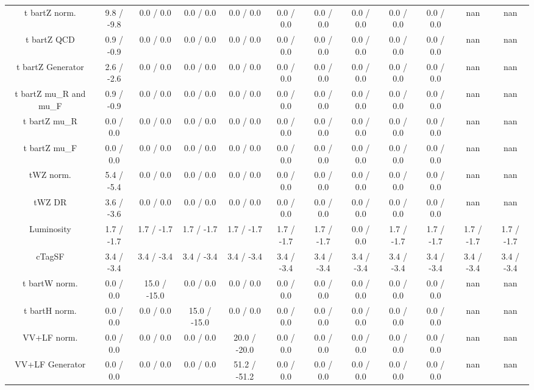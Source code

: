 \begin{table}[htbp]
\begin{center}
\begin{tabular}{|c|c|c|c|c|c|c|c|c|c|c|c|}
  t bar{t}Z norm. & 9.8 / -9.8 & 0.0 / 0.0 & 0.0 / 0.0 & 0.0 / 0.0 & 0.0 / 0.0 & 0.0 / 0.0 & 0.0 / 0.0 & 0.0 / 0.0 & 0.0 / 0.0 &    nan    &    nan    \\ 
  t bar{t}Z QCD & 0.9 / -0.9 & 0.0 / 0.0 & 0.0 / 0.0 & 0.0 / 0.0 & 0.0 / 0.0 & 0.0 / 0.0 & 0.0 / 0.0 & 0.0 / 0.0 & 0.0 / 0.0 &    nan    &    nan    \\ 
  t bar{t}Z Generator & 2.6 / -2.6 & 0.0 / 0.0 & 0.0 / 0.0 & 0.0 / 0.0 & 0.0 / 0.0 & 0.0 / 0.0 & 0.0 / 0.0 & 0.0 / 0.0 & 0.0 / 0.0 &    nan    &    nan    \\ 
  t bar{t}Z  mu_{R} and  mu_{F} & 0.9 / -0.9 & 0.0 / 0.0 & 0.0 / 0.0 & 0.0 / 0.0 & 0.0 / 0.0 & 0.0 / 0.0 & 0.0 / 0.0 & 0.0 / 0.0 & 0.0 / 0.0 &    nan    &    nan    \\ 
  t bar{t}Z  mu_{R} & 0.0 / 0.0 & 0.0 / 0.0 & 0.0 / 0.0 & 0.0 / 0.0 & 0.0 / 0.0 & 0.0 / 0.0 & 0.0 / 0.0 & 0.0 / 0.0 & 0.0 / 0.0 &    nan    &    nan    \\ 
  t bar{t}Z  mu_{F} & 0.0 / 0.0 & 0.0 / 0.0 & 0.0 / 0.0 & 0.0 / 0.0 & 0.0 / 0.0 & 0.0 / 0.0 & 0.0 / 0.0 & 0.0 / 0.0 & 0.0 / 0.0 &    nan    &    nan    \\ 
  tWZ norm. & 5.4 / -5.4 & 0.0 / 0.0 & 0.0 / 0.0 & 0.0 / 0.0 & 0.0 / 0.0 & 0.0 / 0.0 & 0.0 / 0.0 & 0.0 / 0.0 & 0.0 / 0.0 &    nan    &    nan    \\ 
  tWZ DR & 3.6 / -3.6 & 0.0 / 0.0 & 0.0 / 0.0 & 0.0 / 0.0 & 0.0 / 0.0 & 0.0 / 0.0 & 0.0 / 0.0 & 0.0 / 0.0 & 0.0 / 0.0 &    nan    &    nan    \\ 
  Luminosity & 1.7 / -1.7 & 1.7 / -1.7 & 1.7 / -1.7 & 1.7 / -1.7 & 1.7 / -1.7 & 1.7 / -1.7 & 0.0 / 0.0 & 1.7 / -1.7 & 1.7 / -1.7 & 1.7 / -1.7 & 1.7 / -1.7 \\ 
  cTagSF & 3.4 / -3.4 & 3.4 / -3.4 & 3.4 / -3.4 & 3.4 / -3.4 & 3.4 / -3.4 & 3.4 / -3.4 & 3.4 / -3.4 & 3.4 / -3.4 & 3.4 / -3.4 & 3.4 / -3.4 & 3.4 / -3.4 \\ 
  t bar{t}W norm. & 0.0 / 0.0 & 15.0 / -15.0 & 0.0 / 0.0 & 0.0 / 0.0 & 0.0 / 0.0 & 0.0 / 0.0 & 0.0 / 0.0 & 0.0 / 0.0 & 0.0 / 0.0 &    nan    &    nan    \\ 
  t bar{t}H norm. & 0.0 / 0.0 & 0.0 / 0.0 & 15.0 / -15.0 & 0.0 / 0.0 & 0.0 / 0.0 & 0.0 / 0.0 & 0.0 / 0.0 & 0.0 / 0.0 & 0.0 / 0.0 &    nan    &    nan    \\ 
  VV+LF norm. & 0.0 / 0.0 & 0.0 / 0.0 & 0.0 / 0.0 & 20.0 / -20.0 & 0.0 / 0.0 & 0.0 / 0.0 & 0.0 / 0.0 & 0.0 / 0.0 & 0.0 / 0.0 &    nan    &    nan    \\ 
  VV+LF Generator & 0.0 / 0.0 & 0.0 / 0.0 & 0.0 / 0.0 & 51.2 / -51.2 & 0.0 / 0.0 & 0.0 / 0.0 & 0.0 / 0.0 & 0.0 / 0.0 & 0.0 / 0.0 &    nan    &    nan    \\ 

\end{tabular}
\end{center}
\end{table}
